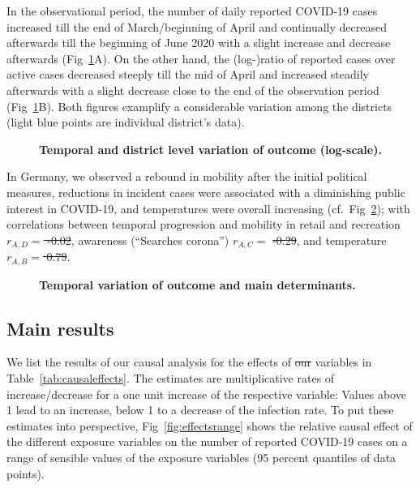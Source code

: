 \documentclass[10pt,letterpaper]{article}
\providecommand{\DIFaddtex}[1]{{\protect\color{blue}\uwave{#1}}} %
\providecommand{\DIFdeltex}[1]{{\protect\color{red}\sout{#1}}}                      %
\providecommand{\DIFaddbegin}{} %
\providecommand{\DIFaddend}{} %
\providecommand{\DIFdelbegin}{} %
\providecommand{\DIFdelend}{} %
\providecommand{\DIFadd}[1]{\texorpdfstring{\DIFaddtex{#1}}{#1}} %
\providecommand{\DIFdel}[1]{\texorpdfstring{\DIFdeltex{#1}}{}} %
\newcommand{\DIFscaledelfig}{0.5}
\newlength{\DIFdelgraphicswidth} %
\newlength{\DIFdelgraphicsheight} %
\newcommand{\DIFaddincludegraphics}[2][]{{\color{blue}\fbox{\DIFOincludegraphics[#1]{#2}}}} %
\newcommand{\DIFdelincludegraphics}[2][]{%
\sbox{\DIFdelgraphicsbox}{\DIFOincludegraphics[#1]{#2}}%
\settoboxwidth{\DIFdelgraphicswidth}{\DIFdelgraphicsbox} %
\settoboxtotalheight{\DIFdelgraphicsheight}{\DIFdelgraphicsbox} %
\scalebox{\DIFscaledelfig}{%
\parbox[b]{\DIFdelgraphicswidth}{\usebox{\DIFdelgraphicsbox}\\[-\baselineskip] \rule{\DIFdelgraphicswidth}{0em}}\llap{\resizebox{\DIFdelgraphicswidth}{\DIFdelgraphicsheight}{%
\setlength{\unitlength}{\DIFdelgraphicswidth}%
\begin{picture}(1,1)%
\thicklines\linethickness{2pt} %
{\color[rgb]{1,0,0}\put(0,0){\framebox(1,1){}}}%
{\color[rgb]{1,0,0}\put(0,0){\line( 1,1){1}}}%
{\color[rgb]{1,0,0}\put(0,1){\line(1,-1){1}}}%
\end{picture}%
}\hspace*{3pt}}} %
} %
\DeclareRobustCommand{\DIFaddbegin}{\DIFOaddbegin \let\includegraphics\DIFaddincludegraphics} %
\DeclareRobustCommand{\DIFaddend}{\DIFOaddend \let\includegraphics\DIFOincludegraphics} %
\DeclareRobustCommand{\DIFdelbegin}{\DIFOdelbegin \let\includegraphics\DIFdelincludegraphics} %
\DeclareRobustCommand{\DIFdelend}{\DIFOaddend \let\includegraphics\DIFOincludegraphics} %
\begin{document}
In the observational period, the number of daily reported COVID-19 cases increased till the end of March/beginning of April and continually decreased afterwards till the beginning of June 2020 with a slight increase and decrease afterwards (Fig~\ref{fig:cases-log}A). On the other hand, the (log-)ratio of reported cases over active cases decreased steeply till the mid of April and increased steadily afterwards with a slight decrease close to the end of the observation period (Fig~\ref{fig:cases-log}B). Both figures examplify a considerable variation among the districts (light blue points are individual district's data).

\begin{figure}[!h]
\caption{{\bf Temporal and district level variation of outcome (log-scale).}}
\label{fig:cases-log}
\end{figure}

In Germany, we observed a rebound in mobility after the initial political measures, reductions in incident cases were associated with a diminishing public interest in COVID-19, and temperatures were overall increasing (cf.~Fig~\ref{fig:timeseries}); with correlations between temporal progression and mobility in retail and recreation \DIFdelbegin \DIFdel{\(r_{A,D}=\)
-0.02}\DIFdelend \DIFaddbegin \DIFadd{\(r_{A,B}=\) 0.02}\DIFaddend , awareness (``Searches corona'') \(r_{A,C}=\) \DIFdelbegin \DIFdel{-0.29}\DIFdelend \DIFaddbegin \DIFadd{-0.3}\DIFaddend , and temperature \DIFdelbegin \DIFdel{\(r_{A,B}=\) 0.79}\DIFdelend \DIFaddbegin \DIFadd{\(r_{A,D}=\) 0.8}\DIFaddend .

\begin{figure}[!h]
\caption{{\bf Temporal variation of outcome and main
determinants.}}
\label{fig:timeseries}
\end{figure}

\subsection{Main results}\label{main-results}

We list the results of our causal analysis for the effects of \DIFdelbegin \DIFdel{our
}\DIFdelend \DIFaddbegin \DIFadd{different exposure }\DIFaddend variables in Table~\ref{tab:causaleffects}. The estimates are multiplicative rates of increase/decrease for a one unit increase of the respective variable: Values above 1 lead to an increase, below 1 to a decrease of the infection rate. To put these estimates into perspective, Fig~\ref{fig:effectsrange} shows the relative causal effect of the different exposure variables on the number of reported COVID-19 cases on a range of sensible values of the exposure variables (95 percent quantiles of data points).
\end{document}
